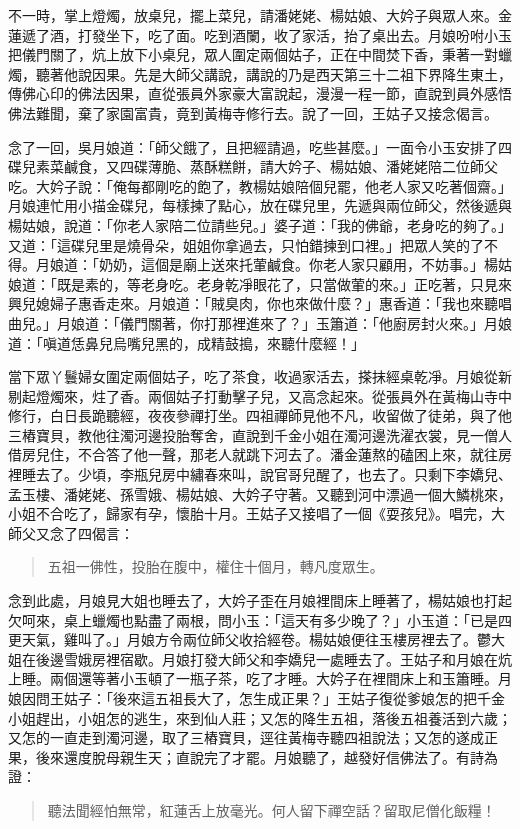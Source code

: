 不一時，掌上燈燭，放桌兒，擺上菜兒，請潘姥姥、楊姑娘、大妗子與眾人來。金蓮遞了酒，打發坐下，吃了面。吃到酒闌，收了家活，抬了桌出去。月娘吩咐小玉把儀門關了，炕上放下小桌兒，眾人圍定兩個姑子，正在中間焚下香，秉著一對蠟燭，聽著他說因果。先是大師父講說，講說的乃是西天第三十二祖下界降生東土，傳佛心印的佛法因果，直從張員外家豪大富說起，漫漫一程一節，直說到員外感悟佛法難聞，棄了家園富貴，竟到黃梅寺修行去。說了一回，王姑子又接念偈言。

念了一回，吳月娘道：「師父餓了，且把經請過，吃些甚麼。」一面令小玉安排了四碟兒素菜鹹食，又四碟薄脆、蒸酥糕餅，請大妗子、楊姑娘、潘姥姥陪二位師父吃。大妗子說：「俺每都剛吃的飽了，教楊姑娘陪個兒罷，他老人家又吃著個齋。」月娘連忙用小描金碟兒，每樣揀了點心，放在碟兒里，先遞與兩位師父，然後遞與楊姑娘，說道：「你老人家陪二位請些兒。」婆子道：「我的佛爺，老身吃的夠了。」又道：「這碟兒里是燒骨朵，姐姐你拿過去，只怕錯揀到口裡。」把眾人笑的了不得。月娘道：「奶奶，這個是廟上送來托葷鹹食。你老人家只顧用，不妨事。」楊姑娘道：「既是素的，等老身吃。老身乾凈眼花了，只當做葷的來。」正吃著，只見來興兒媳婦子惠香走來。月娘道：「賊臭肉，你也來做什麼？」惠香道：「我也來聽唱曲兒。」月娘道：「儀門關著，你打那裡進來了？」玉簫道：「他廚房封火來。」月娘道：「嗔道恁鼻兒烏嘴兒黑的，成精鼓搗，來聽什麼經！」

當下眾丫鬟婦女圍定兩個姑子，吃了茶食，收過家活去，搽抹經桌乾凈。月娘從新剔起燈燭來，炷了香。兩個姑子打動擊子兒，又高念起來。從張員外在黃梅山寺中修行，白日長跪聽經，夜夜參禪打坐。四祖禪師見他不凡，收留做了徒弟，與了他三樁寶貝，教他往濁河邊投胎奪舍，直說到千金小姐在濁河邊洗濯衣裳，見一僧人借房兒住，不合答了他一聲，那老人就跳下河去了。潘金蓮熬的磕困上來，就往房裡睡去了。少頃，李瓶兒房中繡春來叫，說官哥兒醒了，也去了。只剩下李嬌兒、孟玉樓、潘姥姥、孫雪娥、楊姑娘、大妗子守著。又聽到河中漂過一個大鱗桃來，小姐不合吃了，歸家有孕，懷胎十月。王姑子又接唱了一個《耍孩兒》。唱完，大師父又念了四偈言：
\begin{quote}
五祖一佛性，投胎在腹中，權住十個月，轉凡度眾生。
\end{quote}

念到此處，月娘見大姐也睡去了，大妗子歪在月娘裡間床上睡著了，楊姑娘也打起欠呵來，桌上蠟燭也點盡了兩根，問小玉：「這天有多少晚了？」小玉道：「已是四更天氣，雞叫了。」月娘方令兩位師父收拾經卷。楊姑娘便往玉樓房裡去了。鬱大姐在後邊雪娥房裡宿歇。月娘打發大師父和李嬌兒一處睡去了。王姑子和月娘在炕上睡。兩個還等著小玉頓了一瓶子茶，吃了才睡。大妗子在裡間床上和玉簫睡。月娘因問王姑子：「後來這五祖長大了，怎生成正果？」王姑子復從爹娘怎的把千金小姐趕出，小姐怎的逃生，來到仙人莊；又怎的降生五祖，落後五祖養活到六歲；又怎的一直走到濁河邊，取了三樁寶貝，逕往黃梅寺聽四祖說法；又怎的遂成正果，後來還度脫母親生天；直說完了才罷。月娘聽了，越發好信佛法了。有詩為證：
\begin{quote}
聽法聞經怕無常，紅蓮舌上放毫光。何人留下禪空話？留取尼僧化飯糧！
\end{quote}
